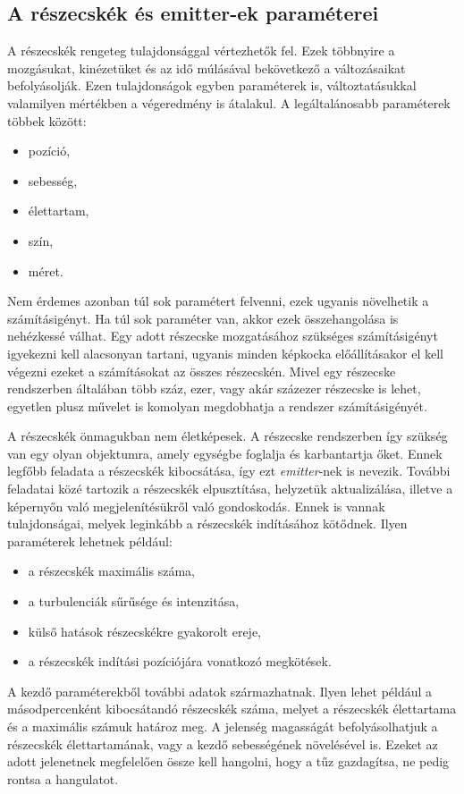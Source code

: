 \subsection{A részecskék és emitter-ek paraméterei}
A részecskék rengeteg tulajdonsággal vértezhetők fel. Ezek többnyire a mozgásukat, kinézetüket és az idő múlásával bekövetkező a változásaikat befolyásolják. Ezen tulajdonságok egyben paraméterek is, változtatásukkal valamilyen mértékben a végeredmény is átalakul. A legáltalánosabb paraméterek többek között:
\begin{itemize}
\item pozíció, 
\item sebesség, 
\item élettartam, 
\item szín, 
\item méret. 
\end{itemize}
Nem érdemes azonban túl sok paramétert felvenni, ezek ugyanis növelhetik a számításigényt. Ha túl sok paraméter van, akkor ezek összehangolása is nehézkessé válhat. Egy adott részecske mozgatásához szükséges számításigényt igyekezni kell alacsonyan tartani, ugyanis minden képkocka előállításakor el kell végezni ezeket a számításokat az összes részecskén. Mivel egy részecske rendszerben általában több száz, ezer, vagy akár százezer részecske is lehet, egyetlen plusz művelet is komolyan megdobhatja a rendszer számításigényét.

A részecskék önmagukban nem életképesek. A részecske rendszerben így szükség van egy olyan objektumra, amely egységbe foglalja és karbantartja őket. Ennek  legfőbb feladata a részecskék kibocsátása, így ezt \textit{emitter}-nek is nevezik. További feladatai közé tartozik a részecskék elpusztítása, helyzetük aktualizálása, illetve a képernyőn való megjelenítésükről való gondoskodás. Ennek is vannak tulajdonságai, melyek leginkább a részecskék indításához kötődnek. Ilyen paraméterek lehetnek például:
\begin{itemize}
\item a részecskék maximális száma, 
\item a turbulenciák sűrűsége és intenzitása, 
\item külső hatások részecskékre gyakorolt ereje, 
\item a részecskék indítási pozíciójára vonatkozó megkötések.
\end{itemize}

A kezdő paraméterekből további adatok származhatnak. Ilyen lehet például a másodpercenként kibocsátandó részecskék száma, melyet a részecskék élettartama és a maximális számuk határoz meg. A jelenség magasságát befolyásolhatjuk a részecskék élettartamának, vagy a kezdő sebességének növelésével is. Ezeket az adott jelenetnek megfelelően össze kell hangolni, hogy a tűz gazdagítsa, ne pedig rontsa a hangulatot.

